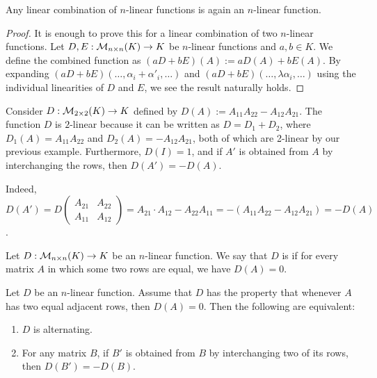 \begin{lemma}\label{lem:linear_comb_n_linear}
  Any linear combination of $n$-linear functions is again an $n$-linear function.
\end{lemma}

\begin{proof}
  It is enough to prove this for a linear combination of two $n$-linear functions. Let $D, E : \mathcal{M}_{n \times n}(K) \to K$ be $n$-linear functions and $a, b \in K$. We define the combined function as $(aD + bE)(A) := aD(A) + bE(A)$.
  By expanding $(aD+bE)(\dots, \alpha_i + \alpha'_i, \dots)$ and $(aD+bE)(\dots, \lambda \alpha_i, \dots)$ using the individual linearities of $D$ and $E$, we see the result naturally holds.
\end{proof}

\begin{example}\label{ex:2_linear_det}
  Consider $D : \mathcal{M}_{2 \times 2}(K) \to K$ defined by $D(A) := A_{11}A_{22} - A_{12}A_{21}$. The function $D$ is $2$-linear because it can be written as $D = D_1 + D_2$, where $D_1(A) = A_{11}A_{22}$ and $D_2(A) = -A_{12}A_{21}$, both of which are 2-linear by our previous example. Furthermore, $D(I) = 1$, and if $A'$ is obtained from $A$ by interchanging the rows, then $D(A') = -D(A)$.

  Indeed, $D(A') = D\left(\begin{smallmatrix} A_{21} & A_{22} \\ A_{11} & A_{12} \end{smallmatrix}\right) = A_{21} \cdot A_{12} - A_{22}A_{11} = -(A_{11}A_{22} - A_{12}A_{21}) = -D(A)$.
\end{example}

\begin{definition}\label{def:alternating}
  Let $D : \mathcal{M}_{n \times n}(K) \to K$ be an $n$-linear function. We say that $D$ is  if for every matrix $A$ in which some two rows are equal, we have $D(A) = 0$.
\end{definition}

\begin{proposition}\label{prop:alternating_swap}
  Let $D$ be an $n$-linear function. Assume that $D$ has the property that whenever $A$ has two equal adjacent rows, then $D(A) = 0$. Then the following are equivalent:
  \begin{enumerate}
    \item $D$ is alternating.
    \item For any matrix $B$, if $B'$ is obtained from $B$ by interchanging two of its rows, then $D(B') = -D(B)$.
  \end{enumerate}
\end{proposition}

